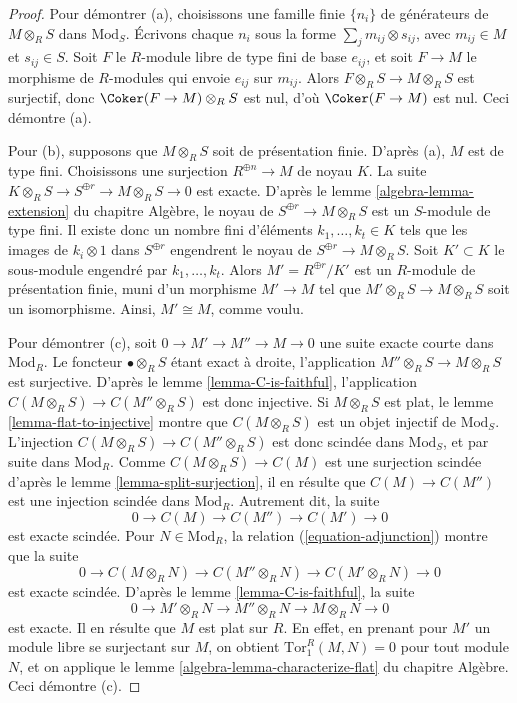 \begin{proof}
Pour démontrer (a), choisissons une famille finie $\{n_i\}$ de générateurs
de $M \otimes_R S$ dans $\text{Mod}_S$.
Écrivons chaque $n_i$ sous la forme $\sum_j m_{ij} \otimes s_{ij}$,
avec $m_{ij} \in M$ et $s_{ij} \in S$.
Soit $F$ le $R$-module libre de type fini de base $e_{ij}$, et soit
$F \to M$ le morphisme de $R$-modules qui envoie $e_{ij}$ sur $m_{ij}$.
Alors $F \otimes_R S\to M \otimes_R S$ est surjectif,
donc $\Coker(F \to M) \otimes_R S$ est nul, d'où $\Coker(F \to M)$ est nul.
Ceci démontre (a).

\medskip\noindent
Pour (b), supposons que $M \otimes_R S$ soit de présentation finie.
D'après (a), $M$ est de type fini. Choisissons une surjection
$R^{\oplus n} \to M$ de noyau $K$.
La suite $K \otimes_R S \to S^{\oplus r} \to M \otimes_R S \to 0$ est exacte.
D'après le lemme \ref{algebra-lemma-extension} du chapitre Algèbre,
le noyau de $S^{\oplus r} \to M \otimes_R S$ est un $S$-module de type fini.
Il existe donc un nombre fini d'éléments $k_1, \ldots, k_t \in K$
tels que les images de $k_i \otimes 1$ dans $S^{\oplus r}$
engendrent le noyau de $S^{\oplus r} \to M \otimes_R S$.
Soit $K' \subset K$ le sous-module engendré par $k_1, \ldots, k_t$.
Alors $M' = R^{\oplus r}/K'$ est un $R$-module de présentation finie,
muni d'un morphisme $M' \to M$ tel que
$M' \otimes_R S \to M \otimes_R S$ soit un isomorphisme.
Ainsi, $M' \cong M$, comme voulu.

\medskip\noindent
Pour démontrer (c), soit $0 \to M' \to M'' \to M \to 0$
une suite exacte courte dans $\text{Mod}_R$.
Le foncteur $\bullet \otimes_R S$ étant exact à droite,
l'application $M'' \otimes_R S \to M \otimes_R S$ est surjective.
D'après le lemme \ref{lemma-C-is-faithful}, l'application
$C(M \otimes_R S) \to C(M'' \otimes_R S)$ est donc injective.
Si $M \otimes_R S$ est plat, le lemme \ref{lemma-flat-to-injective}
montre que $C(M \otimes_R S)$ est un objet injectif de $\text{Mod}_S$.
L'injection $C(M \otimes_R S) \to C(M'' \otimes_R S)$ est donc scindée
dans $\text{Mod}_S$, et par suite dans $\text{Mod}_R$.
Comme $C(M \otimes_R S) \to C(M)$ est une surjection scindée
d'après le lemme \ref{lemma-split-surjection}, il en résulte que
$C(M) \to C(M'')$ est une injection scindée dans $\text{Mod}_R$.
Autrement dit, la suite
$$
0 \to C(M) \to C(M'') \to C(M') \to 0
$$
est exacte scindée. Pour $N \in \text{Mod}_R$,
la relation (\ref{equation-adjunction}) montre que la suite
$$
0 \to C(M \otimes_R N) \to C(M'' \otimes_R N) \to C(M' \otimes_R N) \to 0
$$
est exacte scindée. D'après le lemme \ref{lemma-C-is-faithful}, la suite
$$
0 \to M' \otimes_R N \to M'' \otimes_R N \to M \otimes_R N \to 0
$$
est exacte. Il en résulte que $M$ est plat sur $R$.
En effet, en prenant pour $M'$ un module libre se surjectant sur $M$,
on obtient $\text{Tor}_1^R(M, N) = 0$ pour tout module $N$,
et on applique le lemme \ref{algebra-lemma-characterize-flat}
du chapitre Algèbre. Ceci démontre (c).


\end{proof}
